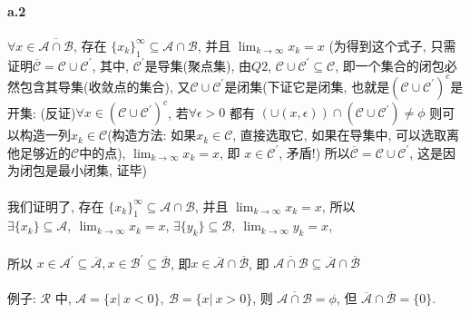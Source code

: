 \documentclass{article}
\begin{document}
\begin{CJK}{UTF8}{gbsn}
  \paragraph{a.2}
    $\forall x \in \overline{\mathcal{A} \cap \mathcal{B}}$, 存在 $\{x_k\}_1^{\infty} \subseteq \mathcal{A} \cap \mathcal{B}$, 并且 $\lim_{k \to \infty} x_k = x$ (为得到这个式子, 只需证明$\overline{\mathcal{C}} = \mathcal{C} \cup \mathcal{C}^{'}$, 其中, $\mathcal{C}^{'}$是导集(聚点集), 由$Q2$, $\mathcal{C} \cup \mathcal{C}^{'} \subseteq \mathcal{C}$, 即一个集合的闭包必然包含其导集(收敛点的集合), 又$\mathcal{C} \cup \mathcal{C}^{'}$是闭集(下证它是闭集, 也就是$(\mathcal{C} \cup \mathcal{C}^{'})^c$是开集: (反证)$\forall x \in (\mathcal{C} \cup \mathcal{C}^{'})^c$, 若$\forall \epsilon > 0$ 都有 $(\cup(x, \epsilon)) \cap (\mathcal{C} \cup \mathcal{C}^{'}) \not= \phi$ 则可以构造一列$x_k \in \mathcal{C}$(构造方法: 如果$x_k \in \mathcal{C}$, 直接选取它, 如果在导集中, 可以选取离他足够近的$\mathcal{C}$中的点), $\lim_{k \to \infty} x_k = x$, 即 $x \in \mathcal{C}^{'}$, 矛盾!) 所以$\overline{\mathcal{C}} = \mathcal{C} \cup \mathcal{C}^{'}$, 这是因为闭包是最小闭集, 证毕)
    \paragraph{}
    我们证明了, 存在 $\{x_k\}_1^{\infty} \subseteq \mathcal{A} \cap \mathcal{B}$, 并且 $\lim_{k \to \infty} x_k = x$, 所以 $\exists \{x_k\} \subseteq \mathcal{A},\ \lim_{k \to \infty} x_k = x$, $\exists \{y_k\} \subseteq \mathcal{B},\ \lim_{k \to \infty} y_k = x$,
    \paragraph{}
    所以 $x \in \mathcal{A}^{'} \subseteq \overline{\mathcal{A}}, x \in \mathcal{B}^{'} \subseteq \overline{\mathcal{B}}$, 即$x \in \overline{\mathcal{A}} \cap \overline{\mathcal{B}}$, 即 $\overline{\mathcal{A} \cap \mathcal{B}} \subseteq \overline{\mathcal{A}} \cap \overline{\mathcal{B}}$
    \paragraph{}
    例子: $\mathcal{R}$ 中, $\mathcal{A} = \{x |\ x < 0\},\ \mathcal{B} = \{x |\ x > 0\}$, 则 $\overline{\mathcal{A} \cap \mathcal{B}} = \phi$, 但 $\overline{\mathcal{A}} \cap \overline{\mathcal{B}} = \{0\}$.

\end{CJK}
\end{document}
